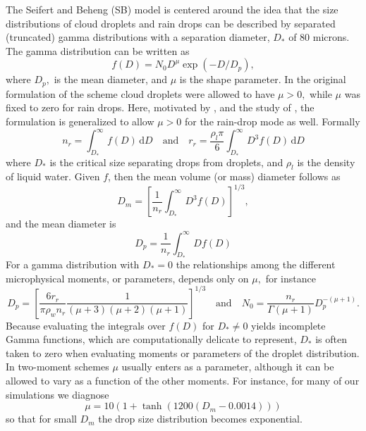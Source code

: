 \documentclass[11pt,a4paper]{article}
\begin{document}
The Seifert and Beheng (SB) model is centered around the idea that the size distributions
of cloud droplets and rain drops can be described by separated
(truncated) gamma distributions with a separation diameter, $D_*$ of
80 microns.  The gamma distribution can be written as
\begin{equation}
f(D) = N_0 D^\mu \exp(-D/D_p),
\end{equation}
where $D_p,$ is the mean diameter, and $\mu$ is the shape parameter.
In the original formulation of the scheme cloud droplets were allowed
to have $\mu>0,$ while $\mu$ was fixed to zero for rain drops.  Here,
motivated by \cite{Seife:2008}, and the study
of \cite{Milbr:2005}, the formulation is generalized to allow $\mu >
0$ for the rain-drop mode as well.  Formally
\begin{equation}
n_r = \int_{D_*}^\infty f(D) \, \mathrm{d}D \quad \text{and} \quad r_r
= \frac{\rho_l\pi}{6} \int_{D_*}^\infty D^3 f(D) \, \mathrm{d}D
\end{equation}
where $D_*$ is the critical size separating drops from droplets, and
$\rho_l$ is the density of liquid water.  Given $f$, then the mean
volume (or mass) diameter follows as
\begin{equation}
D_m = \left[ \frac{1}{n_r} \int_{D_*}^\infty D^3 f(D) \right]^{1/3},
\end{equation}
and the mean diameter is
\begin{equation}
D_p = \frac{1}{n_r} \int_{D_*}^\infty D f(D)
\end{equation}
For a gamma distribution with $D_*=0$ the relationships among the
different microphysical moments, or parameters, depends only on $\mu,$
for instance
\begin{equation}
D_p = [\frac{6r_r}{\pi\rho_w
n_r}\frac{1}{(\mu+3)(\mu+2)(\mu+1)}]^{1/3} \quad \text{and}\quad N_0 =
\frac{n_r}{\Gamma(\mu+1)} D_p^{-(\mu+1)}.
\end{equation}
Because evaluating the integrals over $f(D)$ for $D_*\ne0$ yields
incomplete Gamma functions, which are computationally delicate to
represent, $D_*$ is often taken to zero when evaluating moments or
parameters of the droplet distribution.  In two-moment schemes $\mu$
usually enters as a parameter, although it can be allowed to vary as a
function of the other moments.  For instance, for many of our
simulations we diagnose
\begin{equation}
 \mu = 10(1 + \tanh(1200(D_m - 0.0014))) \label{eq:mu}
\end{equation}
so that for small $D_m$ the drop size distribution becomes
exponential.
\end{document}
